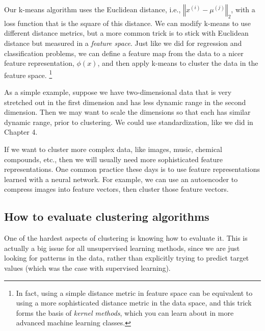 \documentclass[11pt]{article}
\newcommand{\anchorednote}[2]{ #1 \note{#2} }	%
\newcommand{\note}[1]{\todo[color=blue!10,
  linecolor=blue!90,size=\small]{\linespread{0.9}\selectfont{#1}\par}}
\renewcommand{\note}[1]{\footnote{#1}}
\begin{document}
Our k-means algorithm uses the Euclidean distance, 
i.e., $\left\Vert x^{(i)} - \mu^{(j)} \right\Vert_2$, with 
a loss function that is the square of this distance. We can modify
k-means to use different distance metrics, but a more common trick is
to stick with Euclidean distance but measured in a
\textit{feature space}. Just like we did for regression and
classification problems, we can define a feature map from the data to
a nicer feature representation, $\phi(x)$, and then apply k-means to
cluster the data in the\anchorednote{feature space.}{In fact, using a
simple distance metric in feature space can be equivalent to using a
more sophisticated distance metric in the data space, and this trick
forms the basis of \textit{kernel methods}, which you can learn
about in more advanced machine learning classes.}

As a simple example, suppose we have two-dimensional data that is very stretched out in the first dimension and has less dynamic range in the second dimension. Then we may want to scale the dimensions so that each has similar dynamic range, prior to clustering. We could use standardization, like we did in Chapter 4.

If we want to cluster more complex data, like images, music, chemical compounds, etc., then we will usually need more sophisticated feature representations. One common practice these days is to use feature representations learned with a neural network. For example, we can use an autoencoder to compress images into feature vectors, then cluster those feature vectors.



\subsection{How to evaluate clustering algorithms}
\label{sec:eval}
One of the hardest aspects of clustering is knowing how to evaluate it. This is actually a big issue for all unsupervised learning methods, since we are just looking for patterns in the data, rather than explicitly trying to predict target values (which was the case with supervised learning).
\end{document}
